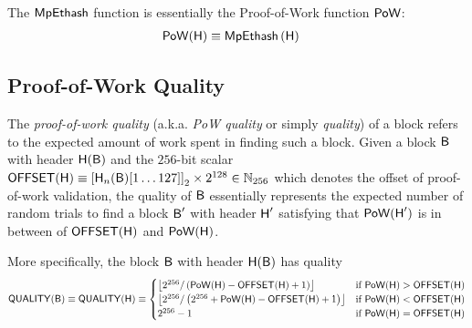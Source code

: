 The $\mathsf{MpEthash}$ function is essentially the Proof-of-Work function $\mathsf{PoW}$:
\begin{align}\label{eq:pow}
	\mathsf{PoW}(\textsf{H}) 
	&\equiv \mathsf{MpEthash}\left(\textsf{H}\right)
\end{align}






\subsection{Proof-of-Work Quality}
\label{subsec:quality}

The \emph{proof-of-work quality} (a.k.a. \emph{PoW quality} or simply \emph{quality}) of a block refers to the expected amount of work spent in finding such a block.
Given a block $\textsf{B}$ with header $\textsf{H}(\textsf{B})$ and 
the $256$-bit scalar $\mathsf{OFFSET}(\textsf{H}) \equiv \left[\textsf{H}_n(\textsf{B})[1\dots127]\right]_2\times 2^{128} \in \mathbb{N}_{256}$ which denotes the offset of proof-of-work validation,
the quality of $\textsf{B}$ essentially represents the expected number of random trials to find a block $\textsf{B}'$ with header $\textsf{H}'$ satisfying that $\mathsf{PoW}(\textsf{H}')$ is in between of $\mathsf{OFFSET}(\textsf{H})$ and $\mathsf{PoW}(\textsf{H})$.

More specifically, the block $\textsf{B}$ with header $\textsf{H}(\textsf{B})$ has quality
\begin{align}
	\mathsf{QUALITY}(\textsf{B})\equiv 
	\mathsf{QUALITY}(\textsf{H}) \equiv
	\begin{cases}
		\left\lfloor2^{256}/\left(\mathsf{PoW}(\textsf{H}) - \mathsf{OFFSET}(\textsf{H}) +1 \right) \right\rfloor 
		& \mbox{if $\mathsf{PoW}(\textsf{H}) > \mathsf{OFFSET}(\textsf{H})$}\\
		\left\lfloor2^{256}/\left(2^{256}+\mathsf{PoW}(\textsf{H}) - \mathsf{OFFSET}(\textsf{H}) +1 \right) \right\rfloor 
		& \mbox{if $\mathsf{PoW}(\textsf{H}) < \mathsf{OFFSET}(\textsf{H})$}\\
		2^{256}-1 &  \mbox{if $\mathsf{PoW}(\textsf{H}) = \mathsf{OFFSET}(\textsf{H})$}
	\end{cases}
\end{align}


